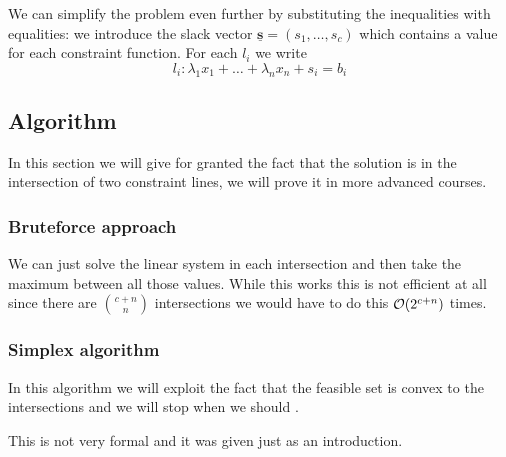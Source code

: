 \documentclass[12pt]{extarticle}
\renewcommand{\vec}[1]{\underline{\mathbf{#1}}}
\begin{document}
We can simplify the problem even further by substituting the inequalities with equalities:
we introduce the slack vector $\vec s = (s_1, \ldots, s_c)$ which contains a value for each constraint function.
For each $l_i$ we write
\begin{equation}
    l_i: \lambda_1 x_1 + \dots + \lambda_n x_n + s_i = b_i
\end{equation}

\subsection{Algorithm}

In this section we will give for granted the fact that the solution is in the intersection of two constraint lines, we will prove it in more advanced courses.

\subsubsection{Bruteforce approach}

We can just solve the linear system in each intersection and then take the maximum between all those values.
While this works this is not efficient at all since there are $\binom{c+n}{n}$ intersections we would have to do this $\mathcal{O}(2^{c+n})$ times.

\subsubsection{Simplex algorithm}

In this algorithm we will exploit the fact that the feasible set is convex to  the intersections and we will stop when we should .

This is not very formal and it was given just as an introduction.
\end{document}
